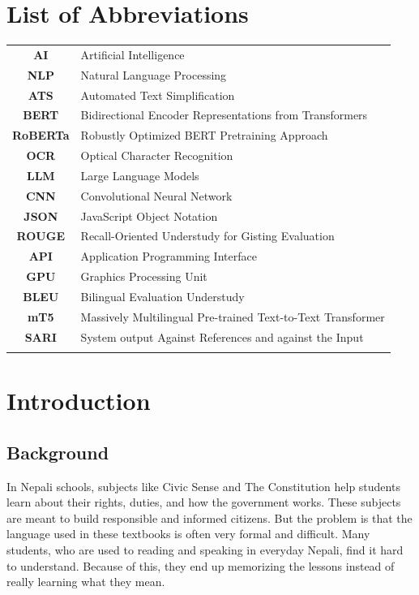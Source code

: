 \documentclass[12pt]{report}
\begin{document}
\tableofcontents
{}
\listoffigures
{}
\chapter*{List of Abbreviations}
\begin{tabular}{c l}
\textbf{AI}     &  Artificial Intelligence\\
\textbf{NLP}    &  Natural Language Processing\\
\textbf{ATS}    &   Automated Text Simplification\\
\textbf{BERT}   &  Bidirectional Encoder Representations from Transformers \\
\textbf{RoBERTa}& Robustly Optimized BERT Pretraining Approach\\
\textbf{OCR}    &Optical Character Recognition\\
\textbf{LLM}    &Large Language Models\\
\textbf{CNN}    &Convolutional Neural Network\\
\textbf{JSON}   &  JavaScript Object Notation\\
\textbf{ROUGE}  &  Recall-Oriented Understudy for Gisting Evaluation\\
\textbf{API}    &  Application Programming Interface\\
\textbf{GPU}    &  Graphics Processing Unit\\
\textbf{BLEU}    &  Bilingual Evaluation Understudy\\
\textbf{mT5}     &  Massively Multilingual Pre-trained Text-to-Text Transformer\\
\textbf{SARI}    &  System output Against References and against the Input\\
\\



\end{tabular}

\chapter{Introduction}
\section{Background}
In Nepali schools, subjects like Civic Sense and The Constitution help students learn about their rights, duties, and how the government works. These subjects are meant to build responsible and informed citizens. But the problem is that the language used in these textbooks is often very formal and difficult. Many students, who are used to reading and speaking in everyday Nepali, find it hard to understand. Because of this, they end up memorizing the lessons instead of really learning what they mean.
\end{document}
